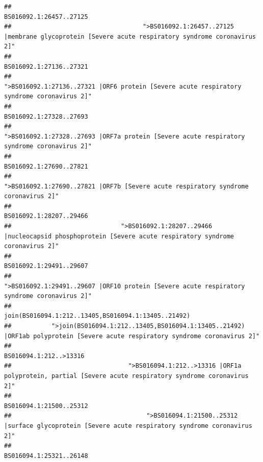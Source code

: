 \documentclass[
]{article}
\begin{document}
\begin{verbatim}
##                                                                                                                BS016092.1:26457..27125 
##                                    ">BS016092.1:26457..27125 |membrane glycoprotein [Severe acute respiratory syndrome coronavirus 2]" 
##                                                                                                                BS016092.1:27136..27321 
##                                             ">BS016092.1:27136..27321 |ORF6 protein [Severe acute respiratory syndrome coronavirus 2]" 
##                                                                                                                BS016092.1:27328..27693 
##                                            ">BS016092.1:27328..27693 |ORF7a protein [Severe acute respiratory syndrome coronavirus 2]" 
##                                                                                                                BS016092.1:27690..27821 
##                                                    ">BS016092.1:27690..27821 |ORF7b [Severe acute respiratory syndrome coronavirus 2]" 
##                                                                                                                BS016092.1:28207..29466 
##                              ">BS016092.1:28207..29466 |nucleocapsid phosphoprotein [Severe acute respiratory syndrome coronavirus 2]" 
##                                                                                                                BS016092.1:29491..29607 
##                                            ">BS016092.1:29491..29607 |ORF10 protein [Severe acute respiratory syndrome coronavirus 2]" 
##                                                                                    join(BS016094.1:212..13405,BS016094.1:13405..21492) 
##           ">join(BS016094.1:212..13405,BS016094.1:13405..21492) |ORF1ab polyprotein [Severe acute respiratory syndrome coronavirus 2]" 
##                                                                                                                 BS016094.1:212..>13316 
##                                ">BS016094.1:212..>13316 |ORF1a polyprotein, partial [Severe acute respiratory syndrome coronavirus 2]" 
##                                                                                                                BS016094.1:21500..25312 
##                                     ">BS016094.1:21500..25312 |surface glycoprotein [Severe acute respiratory syndrome coronavirus 2]" 
##                                                                                                                BS016094.1:25321..26148 

\end{verbatim}
\end{document}
